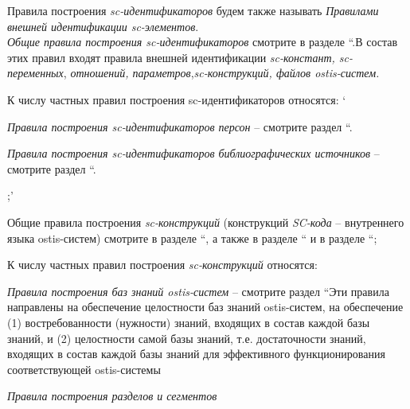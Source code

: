 \begin{SCn}
{\begin{scnvector}
{\begin{scnitemize}
\begin{scnindent}
								\end{scnindent}
			            \end{scnitemize}}
			\item{Правила построения \textit{sc-идентификаторов} будем также
			            называть \textit{Правилами внешней идентификации sc-элементов}.\\
			            \textit{Общие правила построения sc-идентификаторов} смотрите в
			            разделе ``.В состав этих правил входят правила внешней
			            идентификации \textit{sc-констант, sc-переменных}, \textit{отношений,
				            параметров},\textit{sc-конструкций, файлов ostis-систем.}}
			\item{К числу частных правил построения sc-идентификаторов
			            относятся:
			            `		\begin{scnitemize}
				            \item\textit{Правила построения sc-идентификаторов
					            персон} -- смотрите раздел ``.
				            \item\textit{Правила построения sc-идентификаторов
					            библиографических источников} -- смотрите раздел ``.
			            \end{scnitemize}};'
			\item{Общие правила построения \textit{sc-конструкций}
			            (конструкций \textit{SC-кода} -- внутреннего языка ostis-систем) смотрите в
			            разделе ``, а также в разделе
			            `` и в разделе ``\nameref{sd_sc_code_semantic}};
			\item{К числу частных правил построения \textit{sc-конструкций}
			            относятся:
			            \begin{scnitemize}
				            \item \textit{Правила построения баз знаний
					            ostis-систем} -- смотрите раздел ``Эти правила направлены
				            на обеспечение целостности баз знаний ostis-систем, на обеспечение (1)
				            востребованности (нужности) знаний, входящих в состав каждой базы знаний, и (2)
				            целостности самой базы знаний, т.е. достаточности знаний, входящих в состав
				            каждой базы знаний для эффективного функционирования соответствующей
				            ostis-системы
				            \item \textit{Правила построения разделов и сегментов
}
\end{scnitemize}}
\end{scnvector}}
\end{SCn}

